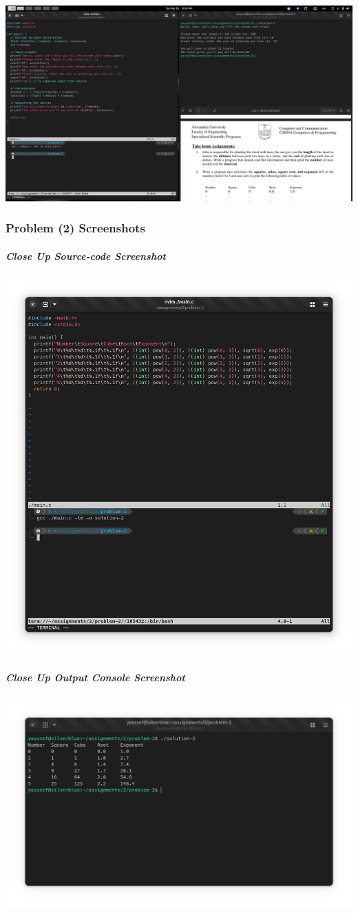 \documentclass[a4paper,11pt]{article}
\theoremstyle{mytheor}
\begin{document}
\includegraphics[width=1\linewidth,center]{desktop-1.png}
\newpage
\subsubsection{Problem (2) Screenshots}
\subparagraph{Close Up Source-code Screenshot\\}
\includegraphics[width=1\linewidth,center]{src-2.png}
\subparagraph{Close Up Output Console Screenshot\\}
\includegraphics[width=1\linewidth,center]{out-2.png}
\end{document}
